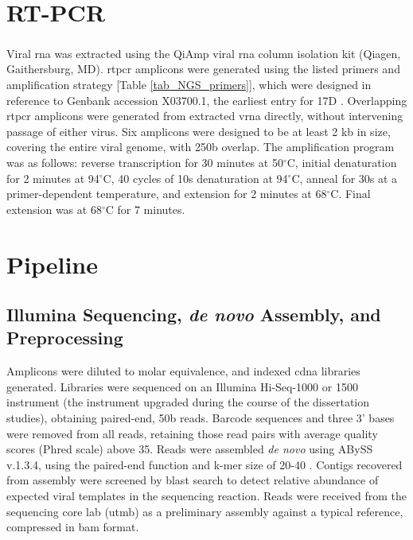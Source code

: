 \section{RT-PCR}
Viral \gls{rna} was extracted using the QiAmp\textsuperscript{\textregistered} viral \gls{rna} column isolation kit (Qiagen, Gaithersburg, MD). \Gls{rtpcr} amplicons were generated using the listed primers and amplification strategy [Table \ref{tab_NGS_primers}], which were designed in reference to Genbank accession X03700.1, the earliest entry for 17D \parencite{Hahn:1987tw}. Overlapping \gls{rtpcr} amplicons were generated from extracted \gls{vrna} directly, without intervening passage of either virus. Six amplicons were designed to be at least 2 \gls{kb} in size, covering the entire viral genome, with 250b overlap. The amplification program was as follows: reverse transcription for 30 minutes at 50$^{\circ}$C, initial denaturation for 2 minutes at 94$^{\circ}$C, 40 cycles of 10s denaturation at 94$^{\circ}$C, anneal for 30s at a primer-dependent temperature, and extension for 2 minutes at 68$^{\circ}$C. Final extension was at 68$^{\circ}$C for 7 minutes. 
\section{Pipeline}
\subsection{Illumina Sequencing,  \emph{de novo} Assembly, and Preprocessing}
Amplicons were diluted to molar equivalence, and indexed \gls{cdna} libraries generated. Libraries were sequenced on an Illumina Hi-Seq-1000 or 1500 instrument (the instrument upgraded during the course of the dissertation studies), obtaining paired-end, 50b reads. Barcode sequences and three 3’ bases were removed from all reads, retaining those read pairs with average quality scores (Phred scale) above 35. Reads were assembled \emph{de novo} using ABySS v.1.3.4, using the paired-end function and k-mer size of 20-40 \parencite{Simpson:2009iv}. Contigs recovered from assembly were screened by \gls{blast} search to detect relative abundance of expected viral templates in the sequencing reaction. Reads were received from the sequencing core lab (\gls{utmb}) as a preliminary assembly against a typical reference, compressed in \gls{bam} format.
